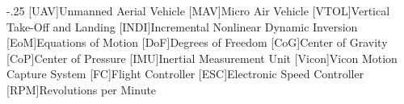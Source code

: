 \documentclass[headsepline,footsepline,footinclude=false,oneside,fontsize=11pt,paper=a4,listof=totoc,bibliography=totoc]{scrbook} %
\begin{document}


\frontmatter{}





\tableofcontents{}

\mainmatter{}











\appendix{}


\begin{acronym}
	\itemsep-.25\baselineskip
	[UAV]{Unmanned Aerial Vehicle}
	[MAV]{Micro Air Vehicle}
	[VTOL]{Vertical Take-Off and Landing}
	[INDI]{Incremental Nonlinear Dynamic Inversion}
	[EoM]{Equations of Motion}
	[DoF]{Degrees of Freedom}
	[CoG]{Center of Gravity}
	[CoP]{Center of Pressure}
	[IMU]{Inertial Measurement Unit}
	[Vicon]{Vicon Motion Capture System}
	[FC]{Flight Controller}
	[ESC]{Electronic Speed Controller}
	[RPM]{Revolutions per Minute}
\end{acronym}

\listoffigures{}
\listoftables{}
\printbibliography{}
\end{document}
